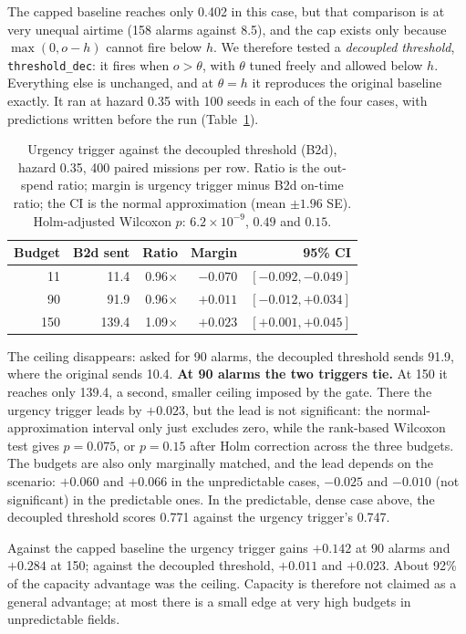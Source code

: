 \documentclass[pdflatex,sn-mathphys-num,iicol]{sn-jnl}
\theoremstyle{thmstyleone}
\theoremstyle{thmstyletwo}
\theoremstyle{thmstylethree}
\begin{document}
The capped baseline reaches only 0.402 in this case, but that comparison is at very
unequal airtime (158 alarms against 8.5), and the cap exists only because $\max(0, o-h)$
cannot fire below $h$. We therefore tested a \emph{decoupled threshold},
\texttt{threshold\_dec}: it fires when $o > \theta$, with $\theta$ tuned freely and allowed
below $h$. Everything else is unchanged, and at $\theta = h$ it reproduces the original
baseline exactly. It ran at hazard 0.35 with 100 seeds in each of the four cases, with
predictions written before the run (Table~\ref{tab:decoupled}).

\begin{table}[t]
\caption{Urgency trigger against the decoupled threshold (B2d), hazard 0.35, 400 paired
missions per row. Ratio is the out-spend ratio; margin is urgency trigger minus B2d
on-time ratio; the CI is the normal approximation (mean $\pm 1.96$ SE). Holm-adjusted
Wilcoxon $p$: $6.2\times10^{-9}$, $0.49$ and $0.15$.}\label{tab:decoupled}
\centering
\footnotesize
\setlength{\tabcolsep}{3pt}
\begin{tabular}{@{}rrrrr@{}}
\toprule
\textbf{Budget} & \textbf{B2d sent} & \textbf{Ratio} & \textbf{Margin} & \textbf{95\% CI} \\
\midrule
11  & 11.4  & 0.96$\times$ & $-0.070$ & $[-0.092,-0.049]$ \\
90  & 91.9  & 0.96$\times$ & $+0.011$ & $[-0.012,+0.034]$ \\
150 & 139.4 & 1.09$\times$ & $+0.023$ & $[+0.001,+0.045]$ \\
\bottomrule
\end{tabular}
\end{table}

The ceiling disappears: asked for 90 alarms, the decoupled threshold sends 91.9, where the
original sends 10.4. \textbf{At 90 alarms the two triggers tie.} At 150 it reaches only
139.4, a second, smaller ceiling imposed by the gate. There the urgency trigger leads by
$+0.023$, but the lead is not significant: the normal-approximation interval only just
excludes zero, while the rank-based Wilcoxon test gives $p=0.075$, or $p=0.15$ after Holm
correction across the three budgets. The budgets are also only marginally matched, and the
lead depends on the scenario: $+0.060$ and $+0.066$ in the unpredictable cases, $-0.025$
and $-0.010$ (not significant) in the predictable ones. In the predictable, dense case above,
the decoupled threshold scores 0.771 against the urgency trigger's 0.747.

Against the capped baseline the urgency trigger gains $+0.142$ at 90 alarms and $+0.284$
at 150; against the decoupled threshold, $+0.011$ and $+0.023$. About 92\% of the
capacity advantage was the ceiling. Capacity is therefore not claimed as a general
advantage; at most there is a small edge at very high budgets in unpredictable fields.
\end{document}
